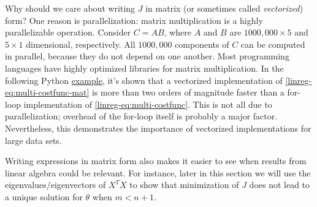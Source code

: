\documentclass{article}
\theoremstyle{definition}
\begin{document}
Why should we care about writing $J$ in matrix (or sometimes called \textit{vectorized}) form? One reason is parallelization: matrix multiplication is a highly parallelizable operation. Consider $C=AB$, where $A$ and $B$ are $1000,000 \times 5$ and $5 \times 1$ dimensional, respectively. All $1000,000$ components of $C$ can be computed in parallel, because they do not depend on one another. Most programming languages have highly optimized libraries for matrix multiplication. In the following Python \href{https://github.com/siavashaslanbeigi/machine_learning/blob/master/lin_reg/matrix.ipynb}{\color{blue} example}, it's shown that a vectorized implementation of \eqref{linreg-eq:multi-costfunc-mat} is more than two orders of magnitude faster than a for-loop implementation of \eqref{linreg-eq:multi-costfunc}. This is not all due to parallelization; overhead of the for-loop itself is probably a major factor. Nevertheless, this demonstrates the importance of vectorized implementations for large data sets.

Writing expressions in matrix form also makes it easier to see when results from linear algebra could be relevant. For instance, later in this section we will use the eigenvalues/eigenvectors of $X^TX$ to show that minimization of $J$ does not lead to a unique solution for $\theta$ when $m<n+1$.


\end{document}
